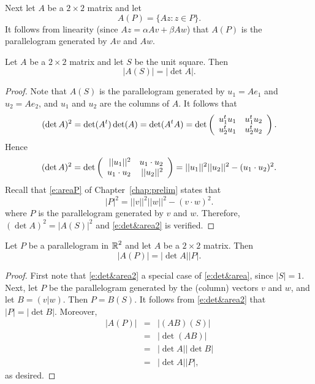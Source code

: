\documentclass{ximera}
\begin{document}
Next let $A$ be a $2\times 2$ matrix and let
\[
A(P) = \{Az:z\in P\}.
\]
It follows from linearity (since $Az=\alpha Av+\beta Aw$) that $A(P)$ is the
parallelogram generated by $Av$ and $Aw$.

\begin{proposition}  \label{P:det&area}
Let $A$ be a $2\times 2$ matrix and let $S$ be the unit square.  Then 
\begin{equation}  \label{e:det&area2}
|A(S)| = |\det A|.
\end{equation}
\end{proposition}

\begin{proof}   Note that $A(S)$ is the parallelogram generated by $u_1=Ae_1$ and 
$u_2=Ae_2$, and $u_1$ and $u_2$ are the columns of $A$.  It follows that
\[
(\det A)^2=\det(A^t)\det(A)=\det(A^tA) =
\det\left(\begin{array}{rr} u_1^tu_1 & u_1^tu_2\\ u_2^tu_1 &u_2^tu_2\end{array}\right).
\]
Hence
\[
(\det A)^2=
\det\left(\begin{array}{rr} ||u_1||^2 & u_1\cdot u_2\\ u_1\cdot u_2 &||u_2||^2\end{array}\right) =
||u_1||^2||u_2||^2-(u_1\cdot u_2)^2.
\]
Recall that \eqref{e:areaP} of Chapter~\ref{chap:prelim} states that
\[
|P|^2 = ||v||^2||w||^2 - (v\cdot w)^2.
\]
where $P$ is the parallelogram generated by $v$ and $w$.  Therefore, 
$(\det A)^2 = |A(S)|^2$ and \eqref{e:det&area2} is verified. \end{proof}


\begin{theorem}  \label{T:det&area}
Let $P$ be a parallelogram in $\mbox{$\Bbb{R}$}^2$ and let $A$ be a $2\times 2$
matrix.  Then
\begin{equation} \label{e:det&area}
|A(P)| = |\det A||P|.
\end{equation}
\end{theorem}

\begin{proof}  First note that \eqref{e:det&area2} a special case of \eqref{e:det&area}, 
since $|S|=1$.   Next, let $P$ be the parallelogram generated by the (column)
vectors $v$ and $w$, and let $B=(v|w)$.  Then $P=B(S)$.  It
follows from \eqref{e:det&area2} that $|P|=|\det B|$.  Moreover,
\begin{eqnarray*}
|A(P)| & = & |(AB)(S)| \\
& = & |\det(AB)| \\
& = & |\det A||\det B| \\
& = & |\det A||P|,
\end{eqnarray*}
as desired.  \end{proof}

\EXER
\end{document}
